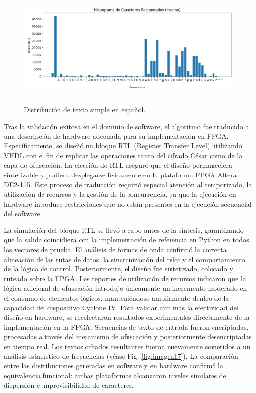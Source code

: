 \begin{figure}[h!] %
    \centering %
     \includegraphics[width=1\textwidth, height=6cm]{imagenes/img16} %
    \caption{ Distribución de texto simple en español.}
    \label{fig:imagen16} %
\end{figure} 

Tras la validación exitosa en el dominio de software, el algoritmo fue traducido a una descripción de hardware adecuada para su implementación en FPGA. Específicamente, se diseñó un bloque RTL (Register Transfer Level) utilizando VHDL con el fin de replicar las operaciones tanto del cifrado César como de la capa de ofuscación. La elección de RTL aseguró que el diseño permaneciera sintetizable y pudiera desplegarse físicamente en la plataforma FPGA Altera DE2-115. Este proceso de traducción requirió especial atención al temporizado, la utilización de recursos y la gestión de la concurrencia, ya que la ejecución en hardware introduce restricciones que no están presentes en la ejecución secuencial del software.

La simulación del bloque RTL se llevó a cabo antes de la síntesis, garantizando que la salida coincidiera con la implementación de referencia en Python en todos los vectores de prueba. El análisis de formas de onda confirmó la correcta alineación de las rutas de datos, la sincronización del reloj y el comportamiento de la lógica de control. Posteriormente, el diseño fue sintetizado, colocado y ruteado sobre la FPGA. Los reportes de utilización de recursos indicaron que la lógica adicional de ofuscación introdujo únicamente un incremento moderado en el consumo de elementos lógicos, manteniéndose ampliamente dentro de la capacidad del dispositivo Cyclone IV.
\clearpage
Para validar aún más la efectividad del diseño en hardware, se recolectaron resultados experimentales directamente de la implementación en la FPGA. Secuencias de texto de entrada fueron encriptadas, procesadas a través del mecanismo de ofuscación y posteriormente desencriptadas en tiempo real. Los textos cifrados resultantes fueron nuevamente sometidos a un análisis estadístico de frecuencias (véase Fig. \ref{fig:imagen17}). La comparación entre las distribuciones generadas en software y en hardware confirmó la equivalencia funcional: ambas plataformas alcanzaron niveles similares de dispersión e imprevisibilidad de caracteres.

